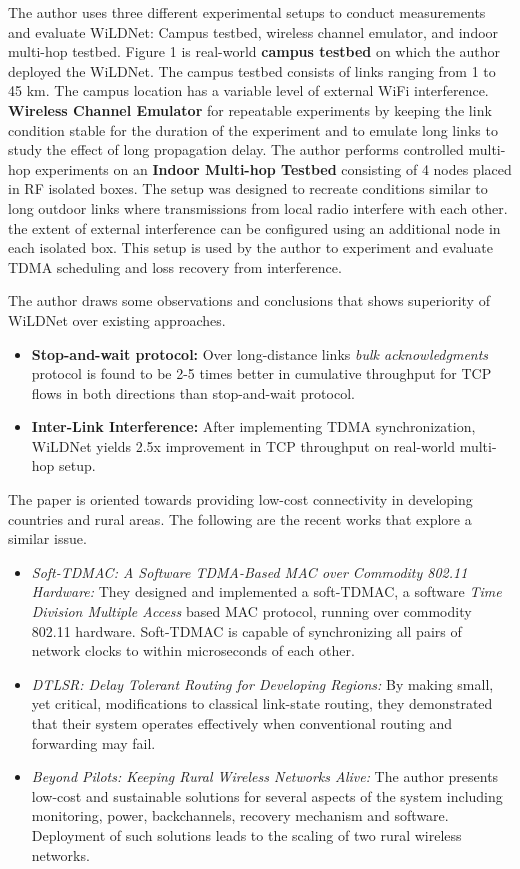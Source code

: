 \documentclass{article}
\begin{document}
\par The author uses three different experimental setups to conduct measurements and evaluate WiLDNet: Campus testbed, wireless channel emulator, and indoor multi-hop testbed. Figure 1 is real-world \textbf{campus testbed} on which the author deployed the WiLDNet. The campus testbed consists of links ranging from 1 to 45 km. The campus location has a variable level of external WiFi interference. \textbf{Wireless Channel Emulator} for repeatable experiments by keeping the link condition stable for the duration of the experiment and to emulate long links to study the effect of long propagation delay. The author performs controlled multi-hop experiments on an \textbf{Indoor Multi-hop Testbed} consisting of 4 nodes placed in RF isolated boxes. The setup was designed to recreate conditions similar to long outdoor links where transmissions from local radio interfere with each other. the extent of external interference can be configured using an additional node in each isolated box. This setup is used by the author to experiment and evaluate TDMA scheduling and loss recovery from interference.
\par The author draws some observations and conclusions that shows superiority of WiLDNet over existing approaches. 
\begin{itemize}
    \item \textbf{Stop-and-wait protocol:} Over long-distance links \textit{bulk acknowledgments} protocol is found to be 2-5 times better in cumulative throughput for TCP flows in both directions than stop-and-wait protocol.
    \item \textbf{Inter-Link Interference: } After implementing TDMA synchronization, WiLDNet yields 2.5x improvement in TCP throughput on real-world multi-hop setup.
\end{itemize}{}
\par The paper is oriented towards providing low-cost connectivity in developing countries and rural areas. The following are the recent works that explore a similar issue.
\begin{itemize}
    \item \textit{Soft-TDMAC: A Software TDMA-Based MAC over Commodity 802.11 Hardware:} They designed and implemented a soft-TDMAC, a software \textit{Time Division Multiple Access} based MAC protocol, running over commodity 802.11 hardware. Soft-TDMAC is capable of synchronizing all pairs of network clocks to within microseconds of each other.
    \item \textit{DTLSR: Delay Tolerant Routing for Developing Regions:}  By making small, yet critical, modifications to classical link-state routing, they demonstrated that their system operates effectively when conventional routing and forwarding may fail.
    \item \textit{Beyond Pilots: Keeping Rural Wireless Networks Alive:} The author presents low-cost and sustainable solutions for several aspects of the system including monitoring, power, backchannels, recovery mechanism and software. Deployment of such solutions leads to the scaling of two rural wireless networks.
\end{itemize}{}
\end{document}
